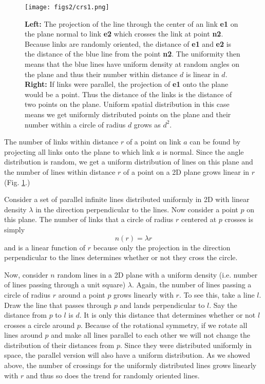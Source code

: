 \documentclass[nofootinbib,preprint,floatfix,titlepage,superscriptaddress]{revtex4} %
\begin{document}
\begin{figure}
    \centering
    \texttt{[image: figs2/crs1.png]}
    \caption{\textbf{Left:} The projection of the line through the center of an link \textsf{\textbf{ e1}} on the plane normal to link \textsf{\textbf{ e2}} which crosses the link at point \textsf{\textbf{ n2}}. Because links are randomly oriented, the distance of \textsf{\textbf{ e1}} and \textsf{\textbf{ e2}} is the distance of the blue line from the point \textsf{\textbf{ n2}}. The uniformity then means that the blue lines have uniform density at random angles on the plane and thus their number within distance $d$ is linear in $d$. \textbf{Right:} If links were parallel, the projection of \textsf{\textbf{ e1}} onto the plane would be a point. Thus the distance of the links is the distance of two points on the plane. Uniform spatial distribution in this case means we get uniformly distributed points on the plane and their number within a circle of radius $d$ grows as $d^2$.}
    \label{fig:crs1}
\end{figure}

The number of links within distance $r$ of a point on link $a$  can be found by projecting all links onto the plane to which link $a$ is normal. 
Since the angle distribution is random, we get a uniform distribution of lines on this plane and the number of lines within distance $r$ of a point on a 2D plane grows linear in $r$ (Fig. \ref{fig:crs1}.)

Consider a set of parallel infinite lines distributed uniformly in 2D with linear density $\lambda$ in the direction perpendicular to the lines. Now consider a point $p$ on this plane. The number of links that a circle of radius $r$ centered at $p$ crosses is simply
\[n(r) = \lambda r \] 
and is a linear function of $r$ because only the projection in the direction perpendicular to the lines determines whether or not they cross the circle. 

Now, consider $n$ random lines in a 2D plane with a uniform density (i.e. number of lines passing through a unit square) $\lambda$. Again, the number of lines passing a circle of radius $r$ around a point $p$ grows linearly with $r$. To see this, take a line $l$. Draw the line that passes through $p$ and lands perpendicular to $l$. Say the distance from $p$ to $l$ is $d$. It is only this distance that determines whether or not $l$ crosses a circle around $p$. Because of the rotational symmetry, if we rotate all lines around $p$ and make all lines parallel to each other we will not change the distribution of their distances from $p$. Since they were distributed uniformly in space, the parallel version will also have a uniform distribution. As we showed above, the number of crossings for the uniformly distributed lines grows linearly with $r$ and thus so does the trend for randomly oriented lines. 
\end{document}
